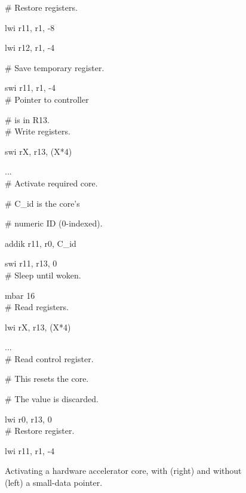 \documentclass{UoYCSproject}
\newenvironment{monospace}{\ttfamily\small}{\par}
\begin{document}
\begin{figure}[H]
\begin{minipage}[t]{0.5\textwidth}
\begin{monospace}
      \# Restore registers.

      lwi    r11, r1, -8

      lwi    r12, r1, -4
      \end{monospace}
    \end{minipage}
    \begin{minipage}[t]{0.5\textwidth}
      \begin{monospace}
      \# Save temporary register.

      swi    r11, r1, -4
\\

      \# Pointer to controller

      \# is in R13.
\\

      \# Write registers.

      swi    rX, r13, (X*4)

      ...
\\

      \# Activate required core.

      \# C\_id is the core's

      \# numeric ID (0-indexed).

      addik  r11, r0, C\_id

      swi    r11, r13, 0
\\

      \# Sleep until woken.

      mbar   16
\\

      \# Read registers.

      lwi    rX, r13, (X*4)

      ...
\\

      \# Read control register.

      \# This resets the core.

      \# The value is discarded.

      lwi    r0, r13, 0
\\

      \# Restore register.

      lwi    r11, r1, -4
      \end{monospace}
    \end{minipage}

  \caption{Activating a hardware accelerator core, with (right) and without (left) a small-data pointer.}
  \label{fig:smallData}
\end{figure}
\end{document}
